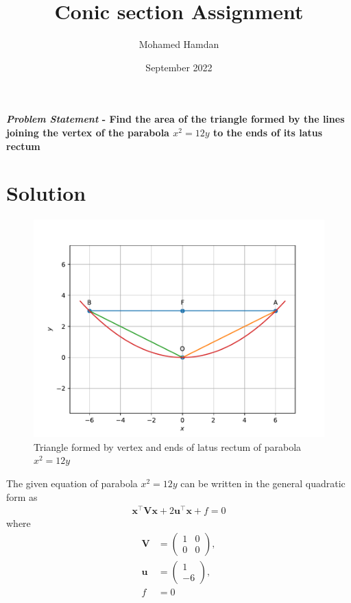 \documentclass[journal,10pt,twocolumn]{article}
\title{\textbf{Conic section Assignment}}
\author{Mohamed Hamdan}
\date{September 2022}
\let\vec\mathbf
\newcommand{\myvec}[1]{\ensuremath{\begin{pmatrix}#1\end{pmatrix}}}
\begin{document}
\maketitle
\paragraph{\textit{Problem Statement} - Find the area of the triangle formed by the lines joining the vertex of the parabola $x^2 = 12y$ to the ends of its latus rectum}

\section*{\large Solution}

\begin{figure}[h]
\centering
\includegraphics[width=1\columnwidth]{figs/fig1.pdf}
\caption{Triangle formed by vertex and ends of latus rectum of parabola $x^2 = 12y$}
\label{fig:parabola}
\end{figure}

The given equation of parabola $x^2 = 12y$ can be written in the general quadratic form as
\begin{align}
    \label{eq:conic_quad_form}
    \vec{x}^{\top}\vec{V}\vec{x}+2\vec{u}^{\top}\vec{x}+f=0
    \end{align}
where
\begin{align}
	\label{eq:V_matrix}
	\vec{V} &= \myvec{1 & 0\\0 & 0},
	\\
	\label{eq:u_vector}
	\vec{u} &= \myvec{1\\-6},
	\\
	\label{eq:f_value}
	f &= 0
\end{align}
\end{document}
